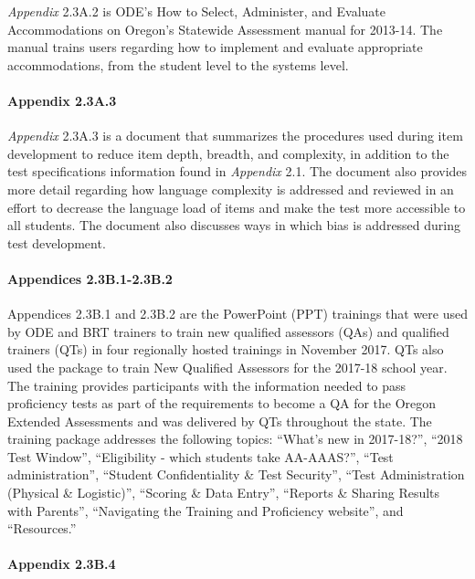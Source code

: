 \documentclass[]{article}
\let\oldparagraph\paragraph
\renewcommand{\paragraph}[1]{\oldparagraph{#1}\mbox{}}
\begin{document}
\emph{Appendix} 2.3A.2 is ODE's How to Select, Administer, and Evaluate
Accommodations on Oregon's Statewide Assessment manual for 2013-14. The
manual trains users regarding how to implement and evaluate appropriate
accommodations, from the student level to the systems level.

\paragraph{Appendix 2.3A.3}\label{appendix-2.3a.3}

\emph{Appendix} 2.3A.3 is a document that summarizes the procedures used
during item development to reduce item depth, breadth, and complexity,
in addition to the test specifications information found in
\emph{Appendix} 2.1. The document also provides more detail regarding
how language complexity is addressed and reviewed in an effort to
decrease the language load of items and make the test more accessible to
all students. The document also discusses ways in which bias is
addressed during test development.

\paragraph{Appendices 2.3B.1-2.3B.2}\label{appendices-2.3b.1-2.3b.2}

Appendices 2.3B.1 and 2.3B.2 are the PowerPoint (PPT) trainings that
were used by ODE and BRT trainers to train new qualified assessors (QAs)
and qualified trainers (QTs) in four regionally hosted trainings in
November 2017. QTs also used the package to train New Qualified
Assessors for the 2017-18 school year. The training provides
participants with the information needed to pass proficiency tests as
part of the requirements to become a QA for the Oregon Extended
Assessments and was delivered by QTs throughout the state. The training
package addresses the following topics: ``What's new in 2017-18?'',
``2018 Test Window'', ``Eligibility - which students take AA-AAAS?'',
``Test administration'', ``Student Confidentiality \& Test Security'',
``Test Administration (Physical \& Logistic)'', ``Scoring \& Data
Entry'', ``Reports \& Sharing Results with Parents'', ``Navigating the
Training and Proficiency website'', and ``Resources.''

\paragraph{Appendix 2.3B.4}\label{appendix-2.3b.4}
\end{document}
